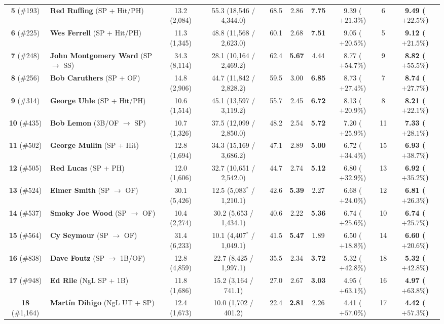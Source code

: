 \documentclass[11pt,letterpaper]{article}
\theoremstyle{plain}
\theoremstyle{definition}
\theoremstyle{remark}
\begin{document}
\begin{table}[htbp]
{\begin{tabular}{@{}clcccccccc@{}}
\textbf{5} (\#193) & \textbf{Red Ruffing} (SP + Hit/PH) & 13.2 (2,084) & 55.3 (18,546 / 4,344.0) & 68.5 & 2.86 & \textbf{7.75} & 9.39 ($+21.3\%$) & 6 & \textbf{9.49 ($+22.5\%$)} \\
\textbf{6} (\#225) & \textbf{Wes Ferrell} (SP + Hit/PH) & 11.3 (1,345) & 48.8 (11,568 / 2,623.0) & 60.1 & 2.68 & \textbf{7.51} & 9.05 ($+20.5\%$) & 5 & \textbf{9.12 ($+21.5\%$)} \\
\textbf{7} (\#248) & \textbf{John Montgomery Ward} (SP $\to$ SS) & 34.3 (8,114) & 28.1 (10,164 / 2,469.2) & 62.4 & \textbf{5.67} & 4.44 & 8.77 ($+54.7\%$) & 9 & \textbf{8.82 ($+55.5\%$)} \\
\textbf{8} (\#256) & \textbf{Bob Caruthers} (SP + OF) & 14.8 (2,906) & 44.7 (11,842 / 2,828.2) & 59.5 & 3.00 & \textbf{6.85} & 8.73 ($+27.4\%$) & 7 & \textbf{8.74 ($+27.7\%$)} \\
\textbf{9} (\#314) & \textbf{George Uhle} (SP + Hit/PH) & 10.6 (1,514) & 45.1 (13,597 / 3,119.2) & 55.7 & 2.45 & \textbf{6.72} & 8.13 ($+20.9\%$) & 8 & \textbf{8.21 ($+22.1\%$)} \\
\textbf{10} (\#435) & \textbf{Bob Lemon} (3B/OF $\to$ SP) & 10.7 (1,326) & 37.5 (12,099 / 2,850.0) & 48.2 & 2.54 & \textbf{5.72} & 7.20 ($+25.9\%$) & 11 & \textbf{7.33 ($+28.1\%$)} \\
\textbf{11} (\#502) & \textbf{George Mullin} (SP + Hit) & 12.8 (1,694) & 34.3 (15,169 / 3,686.2) & 47.1 & 2.89 & \textbf{5.00} & 6.72 ($+34.4\%$) & 15 & \textbf{6.93 ($+38.7\%$)} \\
\textbf{12} (\#505) & \textbf{Red Lucas} (SP + PH) & 12.0 (1,606) & 32.7 (10,651 / 2,542.0) & 44.7 & 2.74 & \textbf{5.12} & 6.80 ($+32.9\%$) & 13 & \textbf{6.92 ($+35.2\%$)} \\
\textbf{13} (\#524) & \textbf{Elmer Smith} (SP $\to$ OF) & 30.1 (5,426) & 12.5 (5,083$^{*}$ / 1,210.1) & 42.6 & \textbf{5.39} & 2.27 & 6.68 ($+24.0\%$) & 12 & \textbf{6.81 ($+26.3\%$)} \\
\textbf{14} (\#537) & \textbf{Smoky Joe Wood} (SP $\to$ OF) & 10.4 (2,274) & 30.2 (5,653 / 1,434.1) & 40.6 & 2.22 & \textbf{5.36} & 6.74 ($+25.6\%$) & 10 & \textbf{6.74 ($+25.7\%$)} \\
\textbf{15} (\#564) & \textbf{Cy Seymour} (SP $\to$ OF) & 31.4 (6,233) & 10.1 (4,407$^{*}$ / 1,049.1) & 41.5 & \textbf{5.47} & 1.89 & 6.50 ($+18.8\%$) & 14 & \textbf{6.60 ($+20.6\%$)} \\
\textbf{16} (\#838) & \textbf{Dave Foutz} (SP $\to$ 1B/OF) & 12.8 (4,859) & 22.7 (8,425 / 1,997.1) & 35.5 & 2.34 & \textbf{3.72} & 5.32 ($+42.8\%$) & 18 & \textbf{5.32 ($+42.8\%$)} \\
\textbf{17} (\#948) & \textbf{Ed Rile} (NgL SP + 1B) & 11.8 (1,686) & 15.2 (3,164 / 741.1) & 27.0 & 2.67 & \textbf{3.03} & 4.95 ($+63.1\%$) & 16 & \textbf{4.97 ($+63.8\%$)} \\
\textbf{18} (\#1,164) & \textbf{Mart\'{i}n Dihigo} (NgL UT + SP) & 12.4 (1,673) & 10.0 (1,702 / 401.2) & 22.4 & \textbf{2.81} & 2.26 & 4.41 ($+57.0\%$) & 17 & \textbf{4.42 ($+57.3\%$)} \\
\bottomrule
\end{tabular}%
}
\end{table}
\end{document}
